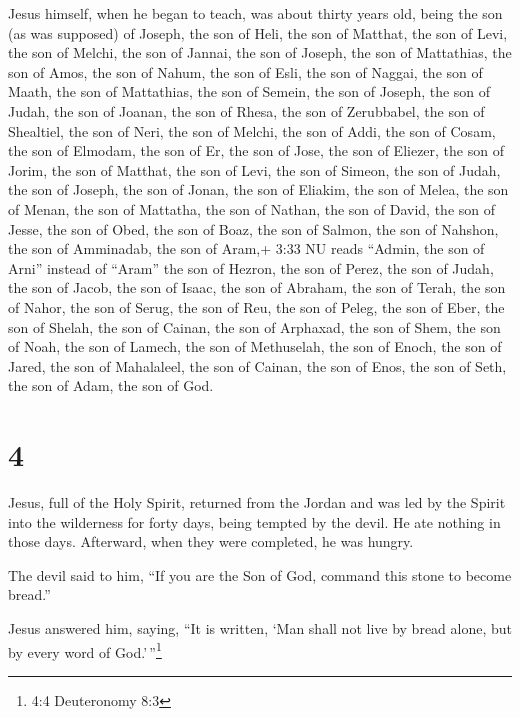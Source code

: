  Jesus himself, when he began to teach, was about thirty
years old, being the son (as was supposed) of Joseph, the son of Heli,
 the son of Matthat, the son of Levi, the son of Melchi,
the son of Jannai, the son of Joseph,  the son of
Mattathias, the son of Amos, the son of Nahum, the son of Esli, the son
of Naggai,  the son of Maath, the son of Mattathias, the
son of Semein, the son of Joseph, the son of Judah,  the
son of Joanan, the son of Rhesa, the son of Zerubbabel, the son of
Shealtiel, the son of Neri,  the son of Melchi, the son of
Addi, the son of Cosam, the son of Elmodam, the son of Er, 
the son of Jose, the son of Eliezer, the son of Jorim, the son of
Matthat, the son of Levi,  the son of Simeon, the son of
Judah, the son of Joseph, the son of Jonan, the son of Eliakim,
 the son of Melea, the son of Menan, the son of Mattatha,
the son of Nathan, the son of David,  the son of Jesse, the
son of Obed, the son of Boaz, the son of Salmon, the son of Nahshon,
 the son of Amminadab, the son of Aram,+ 3:33 NU reads
``Admin, the son of Arni'' instead of ``Aram'' the son of Hezron, the
son of Perez, the son of Judah,  the son of Jacob, the son
of Isaac, the son of Abraham, the son of Terah, the son of Nahor,
 the son of Serug, the son of Reu, the son of Peleg, the
son of Eber, the son of Shelah,  the son of Cainan, the son
of Arphaxad, the son of Shem, the son of Noah, the son of Lamech,
 the son of Methuselah, the son of Enoch, the son of Jared,
the son of Mahalaleel, the son of Cainan,  the son of Enos,
the son of Seth, the son of Adam, the son of God.

\hypertarget{section-3}{%
\section{4}\label{section-3}}

 Jesus, full of the Holy Spirit, returned from the Jordan
and was led by the Spirit into the wilderness  for forty
days, being tempted by the devil. He ate nothing in those days.
Afterward, when they were completed, he was hungry.

 The devil said to him, ``If you are the Son of God, command
this stone to become bread.''

 Jesus answered him, saying, ``It is written, `Man shall not
live by bread alone, but by every word of God.'\,''\footnote{4:4
  Deuteronomy 8:3}


